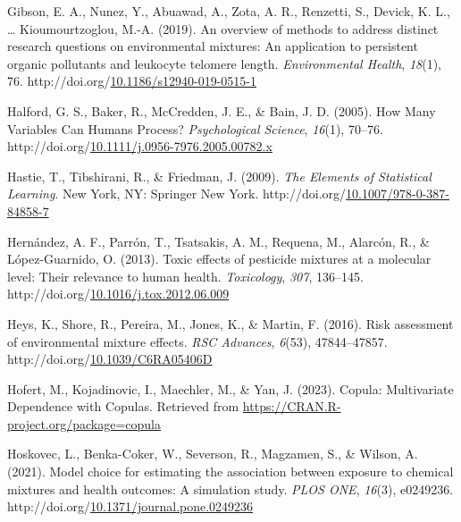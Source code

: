 \documentclass[12pt, twoside]{amherstthesis}
\newenvironment{CSLReferences}[2]%
  {}%
  {\par}
\begin{document}
\begin{CSLReferences}{1}{0}
\leavevmode{}%
Gibson, E. A., Nunez, Y., Abuawad, A., Zota, A. R., Renzetti, S., Devick, K. L., \ldots{} Kioumourtzoglou, M.-A. (2019). An overview of methods to address distinct research questions on environmental mixtures: An application to persistent organic pollutants and leukocyte telomere length. \emph{Environmental Health}, \emph{18}(1), 76. http://doi.org/\href{https://doi.org/10.1186/s12940-019-0515-1}{10.1186/s12940-019-0515-1}

\leavevmode{}%
Halford, G. S., Baker, R., McCredden, J. E., \& Bain, J. D. (2005). How {Many} {Variables} {Can} {Humans} {Process}? \emph{Psychological Science}, \emph{16}(1), 70--76. http://doi.org/\href{https://doi.org/10.1111/j.0956-7976.2005.00782.x}{10.1111/j.0956-7976.2005.00782.x}

\leavevmode{}%
Hastie, T., Tibshirani, R., \& Friedman, J. (2009). \emph{The {Elements} of {Statistical} {Learning}}. New York, NY: Springer New York. http://doi.org/\href{https://doi.org/10.1007/978-0-387-84858-7}{10.1007/978-0-387-84858-7}

\leavevmode{}%
Hernández, A. F., Parrón, T., Tsatsakis, A. M., Requena, M., Alarcón, R., \& López-Guarnido, O. (2013). Toxic effects of pesticide mixtures at a molecular level: {Their} relevance to human health. \emph{Toxicology}, \emph{307}, 136--145. http://doi.org/\href{https://doi.org/10.1016/j.tox.2012.06.009}{10.1016/j.tox.2012.06.009}

\leavevmode{}%
Heys, K., Shore, R., Pereira, M., Jones, K., \& Martin, F. (2016). Risk assessment of environmental mixture effects. \emph{RSC Advances}, \emph{6}(53), 47844--47857. http://doi.org/\href{https://doi.org/10.1039/C6RA05406D}{10.1039/C6RA05406D}

\leavevmode{}%
Hofert, M., Kojadinovic, I., Maechler, M., \& Yan, J. (2023). Copula: {Multivariate} {Dependence} with {Copulas}. Retrieved from \url{https://CRAN.R-project.org/package=copula}

\leavevmode{}%
Hoskovec, L., Benka-Coker, W., Severson, R., Magzamen, S., \& Wilson, A. (2021). Model choice for estimating the association between exposure to chemical mixtures and health outcomes: {A} simulation study. \emph{PLOS ONE}, \emph{16}(3), e0249236. http://doi.org/\href{https://doi.org/10.1371/journal.pone.0249236}{10.1371/journal.pone.0249236}


\end{CSLReferences}
\end{document}
